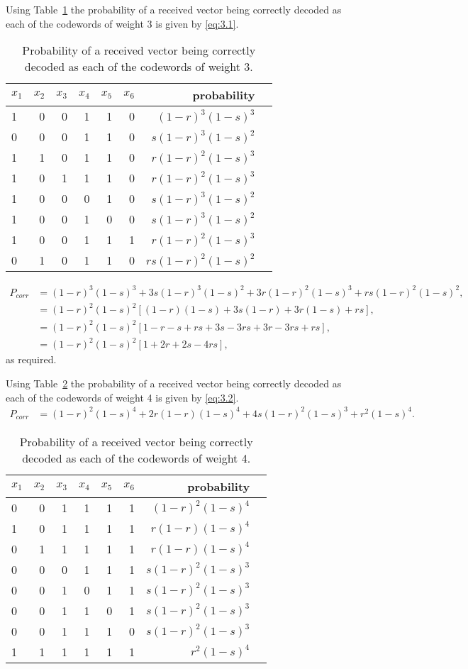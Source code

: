 Using Table~\ref{tab:13} the probability of a received vector being correctly decoded as each of the codewords of weight 3 is given by \eqref{eq:3.1}.
\begin{table}[!htp]\centering
\begin{tabular}{lrrrrr|rr}\toprule
$x_1$ &$x_2$ &$x_3$ &$x_4$ &$x_5$ &$x_6$ &probability \\\midrule
1 &0 &0 &1 &1 &0 &$(1-r)^3(1-s)^3$ \\
0 &0 &0 &1 &1 &0 &$s(1-r)^3(1-s)^2$ \\
1 &1 &0 &1 &1 &0 &$r(1-r)^2(1-s)^3$ \\
1 &0 &1 &1 &1 &0 &$r(1-r)^2(1-s)^3$ \\
1 &0 &0 &0 &1 &0 &$s(1-r)^3(1-s)^2$ \\
1 &0 &0 &1 &0 &0 &$s(1-r)^3(1-s)^2$ \\
1 &0 &0 &1 &1 &1 &$r(1-r)^2(1-s)^3$ \\
0 &1 &0 &1 &1 &0 &$rs(1-r)^2(1-s)^2$ \\
\bottomrule
\end{tabular}
\caption{Probability of a received vector being correctly decoded as each of the codewords of weight 3.}\label{tab:13}
\end{table}
\begin{align}
\label{eq:3.1}
	P_{corr} &= (1-r)^3(1-s)^3 + 3s(1-r)^3(1-s)^2 + 3r(1-r)^2(1-s)^3 +rs(1-r)^2(1-s)^2,\nonumber\\
	&= (1-r)^2(1-s)^2\left[(1-r)(1-s) + 3s(1-r) + 3r(1-s) + rs	\right],\nonumber\\
	&= (1-r)^2(1-s)^2\left[1-r-s + rs +3s -3rs+3r-3rs+rs\right],\nonumber\\
	&= (1-r)^2(1-s)^2\left[1 + 2r + 2s -4rs\right],
\end{align}
as required.

Using Table~\ref{tab:14} the probability of a received vector being correctly decoded as each of the codewords of weight 4 is given by \eqref{eq:3.2}.
\begin{align}
\label{eq:3.2}
	P_{corr} &= (1-r)^2(1-s)^4 + 2r(1-r)(1-s)^4 + 4s(1-r)^2(1-s)^3 + r^2(1-s)^4.
\end{align}
\begin{table}[!htp]\centering
\begin{tabular}{lrrrrr|rr}\toprule
$x_1$ &$x_2$ &$x_3$ &$x_4$ &$x_5$ &$x_6$ &probability \\\midrule
0 &0 &1 &1 &1 &1 &$(1-r)^2(1-s)^4$ \\
1 &0 &1 &1 &1 &1 &$r(1-r)(1-s)^4$ \\
0 &1 &1 &1 &1 &1 &$r(1-r)(1-s)^4$ \\
0 &0 &0 &1 &1 &1 &$s(1-r)^2(1-s)^3$ \\
0 &0 &1 &0 &1 &1 &$s(1-r)^2(1-s)^3$ \\
0 &0 &1 &1 &0 &1 &$s(1-r)^2(1-s)^3$ \\
0 &0 &1 &1 &1 &0 &$s(1-r)^2(1-s)^3$ \\
1 &1 &1 &1 &1 &1 &$r^2(1-s)^4$ \\
\bottomrule
\end{tabular}
\caption{Probability of a received vector being correctly decoded as each of the codewords of weight 4.}\label{tab:14}
\end{table}